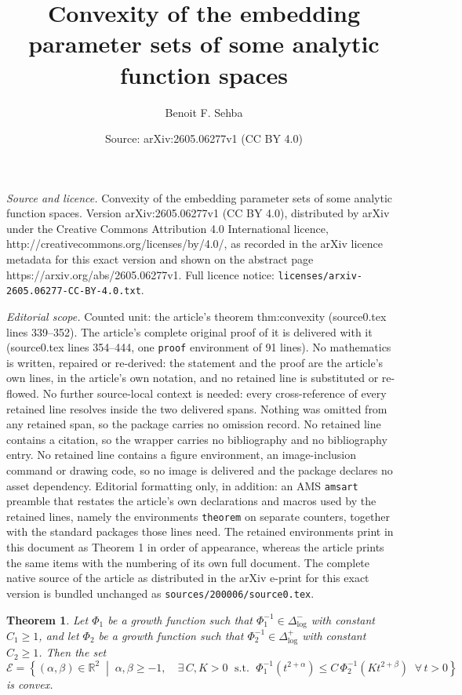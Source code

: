 \documentclass[10pt,a4paper]{amsart}
\title{Convexity of the embedding parameter sets of some analytic function spaces}
\author{Benoit F. Sehba}
\date{Source: arXiv:2605.06277v1 (CC BY 4.0)}
\newtheorem{theorem}{Theorem}
\newcommand{\R}{\mathbb{R}}
\begin{document}
\maketitle

\noindent\emph{Source and licence.} Convexity of the embedding parameter sets of some analytic function spaces. Version arXiv:2605.06277v1 (CC BY 4.0), distributed by arXiv under the Creative Commons Attribution 4.0 International licence, http://creativecommons.org/licenses/by/4.0/, as recorded in the arXiv licence metadata for this exact version and shown on the abstract page https://arxiv.org/abs/2605.06277v1. Full licence notice: \texttt{licenses/arxiv-2605.06277-CC-BY-4.0.txt}.\par\smallskip

\noindent\textit{Editorial scope.} Counted unit: the article's theorem thm:convexity (source0.tex lines 339--352). The article's complete original proof of it is delivered with it (source0.tex lines 354--444, one \texttt{proof} environment of 91 lines). No mathematics is written, repaired or re-derived: the statement and the proof are the article's own lines, in the article's own notation, and no retained line is substituted or re-flowed.  No further source-local context is needed: every cross-reference of every retained line resolves inside the two delivered spans.  Nothing was omitted from any retained span, so the package carries no omission record.  No retained line contains a citation, so the wrapper carries no bibliography and no bibliography entry.  No retained line contains a figure environment, an image-inclusion command or drawing code, so no image is delivered and the package declares no asset dependency.  Editorial formatting only, in addition: an AMS \texttt{amsart} preamble that restates the article's own declarations and macros used by the retained lines, namely the environments \texttt{theorem} on separate counters, together with the standard packages those lines need.  The retained environments print in this document as Theorem 1 in order of appearance, whereas the article prints the same items with the numbering of its own full document.  The complete native source of the article as distributed in the arXiv e-print for this exact version is bundled unchanged as \texttt{sources/200006/source0.tex}.
\begin{theorem}\label{thm:convexity}
Let $\Phi_1$ be a growth function such that $\Phi_1^{-1}\in \Delta_{\log}^-$ with constant $C_1\geq 1$, and let $\Phi_2$ be a growth function such that $\Phi_2^{-1}\in \Delta_{\log}^+$ with constant
$C_2 \ge 1$. Then
the set
\[
\mathcal{E} = \left\{ (\alpha,\beta) \in \R^2 \;\middle|\;
\alpha, \beta \ge -1, \quad
\exists\, C,K > 0 \;\text{ s.t. }\;
\Phi_1^{-1}(t^{2+\alpha}) \le C\,\Phi_2^{-1}(Kt^{2+\beta})
\;\; \forall\, t > 0
\right\}
\]
is convex.
\end{theorem}
\end{document}
